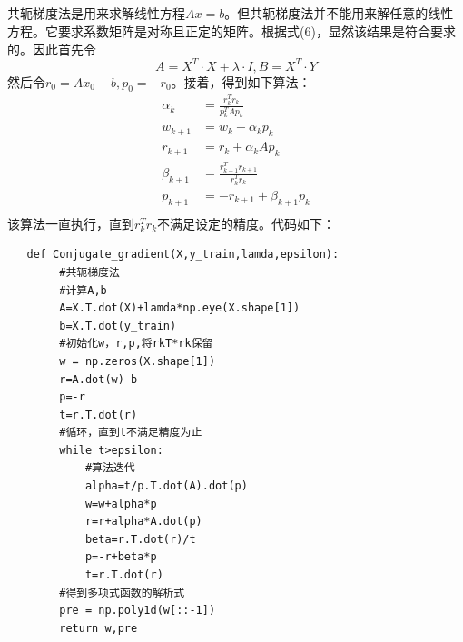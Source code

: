 \documentclass[lang=cn,a4paper,cite=authoryear]{elegantpaper}
\begin{document}
\subsection*{}
共轭梯度法是用来求解线性方程$Ax=b$。但共轭梯度法并不能用来解任意的线性方程。它要求系数矩阵是对称且正定的矩阵。根据式(6)，显然该结果是符合要求的。因此首先令
\begin{equation}
	A=X^T\cdot X+\lambda \cdot I , B=X^T\cdot Y
\end{equation}
然后令$r_{0}=A x_{0}-b, p_{0}=-r_{0}$。接着，得到如下算法：
\begin{equation}
\begin{aligned}
	\alpha _k&=\frac{r_{k}^{T}r_k}{p_{k}^{T}Ap_k}\\
	w_{k+1}&=w_k+\alpha _kp_k\\
	r_{k+1}&=r_k+\alpha _kAp_k\\
	\beta _{k+1}&=\frac{r_{k+1}^{T}r_{k+1}}{r_{k}^{T}r_k}\\
	p_{k+1}&=-r_{k+1}+\beta _{k+1}p_k\\
\end{aligned}
\end{equation}
该算法一直执行，直到$r_{k}^{T}r_k$不满足设定的精度。代码如下：
\begin{verbatim}
   def Conjugate_gradient(X,y_train,lamda,epsilon):
        #共轭梯度法
        #计算A,b
        A=X.T.dot(X)+lamda*np.eye(X.shape[1])
        b=X.T.dot(y_train)
        #初始化w，r,p,将rkT*rk保留
        w = np.zeros(X.shape[1])
        r=A.dot(w)-b
        p=-r
        t=r.T.dot(r)
        #循环，直到t不满足精度为止
        while t>epsilon:
            #算法迭代
            alpha=t/p.T.dot(A).dot(p)
            w=w+alpha*p
            r=r+alpha*A.dot(p)
            beta=r.T.dot(r)/t
            p=-r+beta*p
            t=r.T.dot(r)
        #得到多项式函数的解析式
        pre = np.poly1d(w[::-1])
        return w,pre
\end{verbatim}


\section*{}
\end{document}
